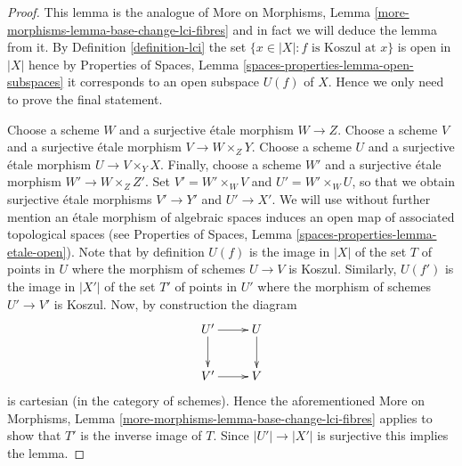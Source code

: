 \documentclass[10pt,a4paper]{amsart}
\theoremstyle{plain}
\theoremstyle{definition}
\theoremstyle{remark}
\numberwithin{equation}{subsection}
\begin{document}
\begin{proof}
This lemma is the analogue of
More on Morphisms, Lemma \ref{more-morphisms-lemma-base-change-lci-fibres}
and in fact we will deduce the lemma from it. By
Definition \ref{definition-lci}
the set $\{x \in |X| : f \text{ is Koszul at }x\}$ is
open in $|X|$ hence by
Properties of Spaces, Lemma \ref{spaces-properties-lemma-open-subspaces}
it corresponds to an open subspace $U(f)$ of $X$. Hence we only need to
prove the final statement.

\medskip\noindent
Choose a scheme $W$ and a surjective \'etale morphism $W \to Z$.
Choose a scheme $V$ and a surjective \'etale morphism $V \to W \times_Z Y$.
Choose a scheme $U$ and a surjective \'etale morphism $U \to V \times_Y X$.
Finally, choose a scheme $W'$ and a surjective \'etale morphism
$W' \to W \times_Z Z'$.
Set $V' = W' \times_W V$ and $U' = W' \times_W U$, so that we obtain
surjective \'etale morphisms $V' \to Y'$ and $U' \to X'$.
We will use without further mention an \'etale morphism of algebraic spaces
induces an open map of associated topological spaces (see
Properties of Spaces, Lemma
\ref{spaces-properties-lemma-etale-open}).
Note that by definition $U(f)$ is the image in $|X|$ of the set $T$
of points in $U$ where the morphism of schemes $U \to V$ is Koszul.
Similarly, $U(f')$ is the image in $|X'|$ of the set $T'$ of points in
$U'$ where the morphism of schemes $U' \to V'$ is Koszul. Now, by construction
the diagram
$$
\xymatrix{
U' \ar[r] \ar[d] & U \ar[d] \\
V' \ar[r] & V
}
$$
is cartesian (in the category of schemes). Hence the aforementioned
More on Morphisms, Lemma \ref{more-morphisms-lemma-base-change-lci-fibres}
applies to show that $T'$ is the inverse image of $T$. Since
$|U'| \to |X'|$ is surjective this implies the lemma.
\end{proof}
\end{document}
